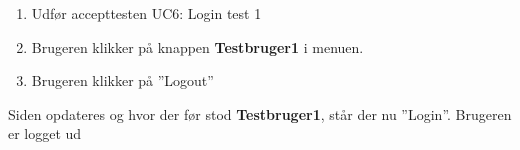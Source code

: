 
		{
		\begin{enumerate}
			\item Udfør accepttesten UC6: Login test 1
			\item Brugeren klikker på knappen \textbf{Testbruger1} i menuen.
			\item Brugeren klikker på ''Logout''
		\end{enumerate}
		} %
		{Siden opdateres og hvor der før stod \textbf{Testbruger1}, står der nu ''Login''. Brugeren er logget ud} %
		{} %
		{} %

